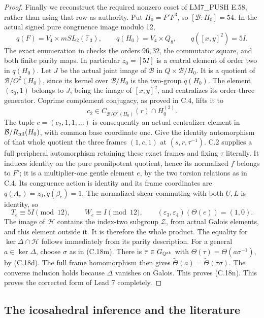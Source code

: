\begin{proof}
Finally we reconstruct the required nonzero coset of
LM7\_PUSH E.58, rather than using that row as authority.
Put \(H_0=F'F^3\), so \([\mathcal B:H_0]=54\).
In the actual signed pure congruence image modulo 12,
\[
 q(F)=V_4\times{
m SL}_2(\mathbb F_3),\qquad
 q(H_0)=V_4\times Q_8,
 \qquad q([x,y]^2)=5I.
 \tag{C.18j}
\]
The exact enumeration in
 checks the orders
\(96,32\), the commutator square, and both finite
parity maps. In particular \(z_0=[5I]\) is a central
element of order two in \(q(H_0)\).
Let \(J\) be the actual joint image of \(\mathcal B\)
in \(Q\times\mathcal B/H_0\). It is a quotient of
\(\mathcal B/O^2(H_0)\), since its kernel over
\(\mathcal B/H_0\) is the two-group \(q(H_0)\).
The element \((z_0,1)\) belongs to \(J\), being the
image of \([x,y]^2\), and centralizes its order-three
generator. Coprime complement conjugacy, as proved in
C.4, lifts it to
\[
 c_2\in C_{\mathcal B/O^2(H_0)}(r)
                   \cap H_0^{(2)}.
\]
The tuple \(c=(c_2,1,1,\ldots)\) is consequently an
actual centralizer element in
\(\mathcal B/R_{\rm nil}(H_0)\), with common base
coordinate one. Give the identity automorphism of
that whole quotient the three frames \((1,c,1)\)
at \((s,r,\tau^{-1})\). C.2 supplies a full peripheral
automorphism retaining these exact frames and fixing
\(\tau\) literally. It induces identity on the pure
pronilpotent quotient, hence its normalized \(f\)
belongs to \(F'\); it is a multiplier-one gentle
element \(e\), by the two torsion relations as in C.4.
Its congruence action is identity and its frame
coordinates are \(q(A_e)=z_0,q(\beta_e)=1\).
The normalized shear commuting with both \(U,L\)
is identity, so
\[
 T_e\equiv5I\pmod{12},\qquad W_e\equiv I\pmod{12},
 \qquad (\varepsilon_3,\varepsilon_4)(\Theta(e))=(1,0).
 \tag{C.18k}
\]
The image of \(\mathcal H\) contains the index-two
subgroup \(\mathcal Z\), from actual Galois elements,
and this element outside it. It is therefore the
whole product. The equality for \(\ker\Delta\cap\mathcal H\)
follows immediately from its parity description.
For a general \(a\in\ker\Delta\), choose \(\sigma\)
as in (C.18m). There is \(\tau\in G_{\mathbb Q^{\rm ab}}\)
with \(\Theta(\tau)=\Theta(a\sigma^{-1})\), by (C.18d).
The full frame homomorphism then gives
\(\widetilde\Theta(a)=\widetilde\Theta(\tau\sigma)\).
The converse inclusion holds because \(\Delta\)
vanishes on Galois. This proves (C.18n).
This proves the corrected form of Lead 7 completely.
\end{proof}

\subsection{The icosahedral inference and the literature}

